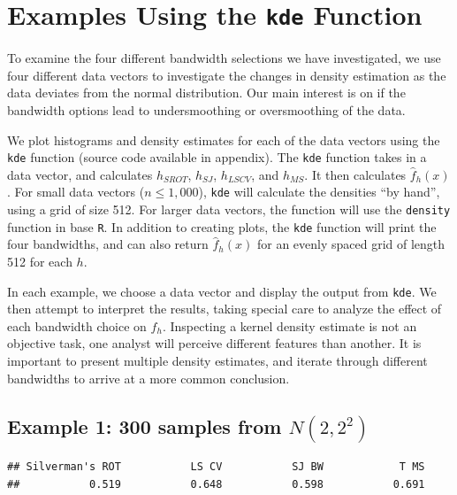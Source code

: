 \documentclass[]{article}
\begin{document}
\section{\texorpdfstring{Examples Using the \texttt{kde}
Function}{Examples Using the kde Function}}\label{examples-using-the-kde-function}

To examine the four different bandwidth selections we have investigated,
we use four different data vectors to investigate the changes in density
estimation as the data deviates from the normal distribution. Our main
interest is on if the bandwidth options lead to undersmoothing or
oversmoothing of the data.

We plot histograms and density estimates for each of the data vectors
using the \texttt{kde} function (source code available in appendix). The
\texttt{kde} function takes in a data vector, and calculates
\(h_{SROT}\), \(h_{SJ}\), \(h_{LSCV}\), and \(h_{MS}\). It then
calculates \(\widehat{f}_h(x)\). For small data vectors
(\(n \leq 1,000\)), \texttt{kde} will calculate the densities ``by
hand'', using a grid of size 512. For larger data vectors, the function
will use the \texttt{density} function in base \texttt{R}. In addition
to creating plots, the \texttt{kde} function will print the four
bandwidths, and can also return \(\widehat{f}_h(x)\) for an evenly
spaced grid of length 512 for each \(h\).

In each example, we choose a data vector and display the output from
\texttt{kde}. We then attempt to interpret the results, taking special
care to analyze the effect of each bandwidth choice on \(\hat{f}_h\).
Inspecting a kernel density estimate is not an objective task, one
analyst will perceive different features than another. It is important
to present multiple density estimates, and iterate through different
bandwidths to arrive at a more common conclusion.

\subsection{Example 1: 300 samples from $N(2, 2^2)$}

\begin{verbatim}
## Silverman's ROT           LS CV           SJ BW            T MS 
##           0.519           0.648           0.598           0.691
\end{verbatim}
\end{document}
